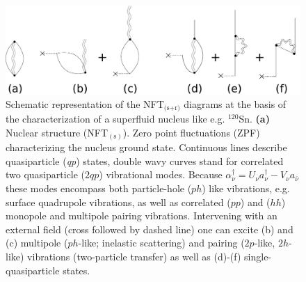 \begin{figure}[h!]
\begin{center}
\includegraphics[width=\textwidth]{introduccion/figs/fig1_4_2.pdf}
\caption{Schematic representation of the NFT$_{\text{(s+r)}}$ diagrams at the basis of the characterization of a superfluid nucleus like e.g. $^{120}$Sn. \textbf{(a)} Nuclear structure (NFT$_{(\text{s})}$). Zero point fluctuations (ZPF) characterizing the nucleus ground state. Continuous lines describe quasiparticle (\textit{qp}) states, double wavy curves stand for correlated two quasiparticle ($2qp$) vibrational modes. Because $\alpha^{\dagger}_{\nu}=U_\nu a^\dagger_\nu-V_\nu a_{\bar{\nu}}$ these modes encompass both particle-hole ($ph$) like vibrations, e.g. surface quadrupole vibrations, as well as correlated ($pp$) and ($hh$) monopole and multipole pairing vibrations. Intervening with an external field (cross followed by dashed line) one can excite (b) and (c) multipole ($ph$-like; inelastic scattering) and  pairing ($2p$-like, $2h$-like) vibrations (two-particle transfer) as well as (d)-(f) single-quasiparticle states.}\label{fig1.4.2}
\end{center}
\end{figure}

